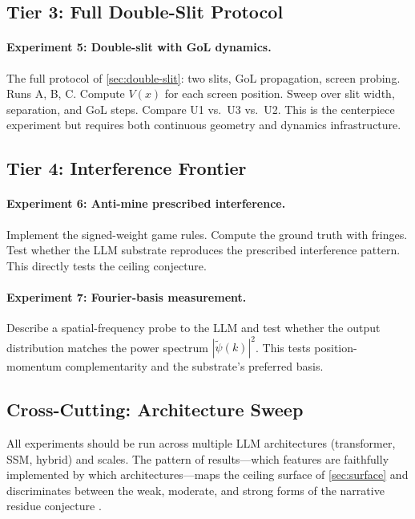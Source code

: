 \documentclass[12pt,a4paper]{article}
\theoremstyle{definition}
\theoremstyle{remark}
\begin{document}
\subsection{Tier 3: Full Double-Slit Protocol}

\paragraph{Experiment 5: Double-slit with GoL dynamics.}
The full protocol of \cref{sec:double-slit}: two slits, GoL propagation, screen probing.  Runs A, B, C.  Compute $V(x)$ for each screen position.  Sweep over slit width, separation, and GoL steps.  Compare U1 vs.\ U3 vs.\ U2.  This is the centerpiece experiment but requires both continuous geometry and dynamics infrastructure.

\subsection{Tier 4: Interference Frontier}

\paragraph{Experiment 6: Anti-mine prescribed interference.}
Implement the signed-weight game rules.  Compute the ground truth with fringes.  Test whether the LLM substrate reproduces the prescribed interference pattern.  This directly tests the ceiling conjecture.

\paragraph{Experiment 7: Fourier-basis measurement.}
Describe a spatial-frequency probe to the LLM and test whether the output distribution matches the power spectrum $|\tilde{\psi}(k)|^2$.  This tests position-momentum complementarity and the substrate's preferred basis.

\subsection{Cross-Cutting: Architecture Sweep}

All experiments should be run across multiple LLM architectures (transformer, SSM, hybrid) and scales.  The pattern of results---which features are faithfully implemented by which architectures---maps the ceiling surface of \cref{sec:surface} and discriminates between the weak, moderate, and strong forms of the narrative residue conjecture \citep{Baldo2026Residue}.
\end{document}

